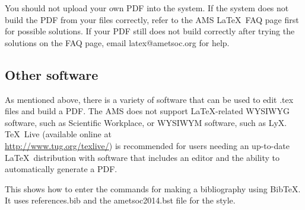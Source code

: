 \documentclass{ametsoc}
\begin{document}
You should not upload your own PDF into
the system. If the system does not build the PDF from your files correctly,
refer to the AMS \LaTeX\ FAQ page first for possible solutions. If your PDF
still does not build correctly after trying the solutions on the FAQ page, email
latex@ametsoc.org for help.

\subsection{Other software}
As mentioned above, there is a variety of software that can be used to edit
.tex files and build a PDF.  The AMS does not support \LaTeX\/-related
WYSIWYG software, such as Scientific Workplace, or WYSIWYM software, such as
LyX.  \TeX\ Live (available online at \\ \url{http://www.tug.org/texlive/}) is
recommended for users needing an up-to-date \LaTeX\ distribution with
software that includes an editor and the ability to automatically generate a
PDF.




 This shows how to enter the commands for making a bibliography using
 BibTeX. It uses references.bib and the ametsoc2014.bst file for the style.

 
 

\end{document}

